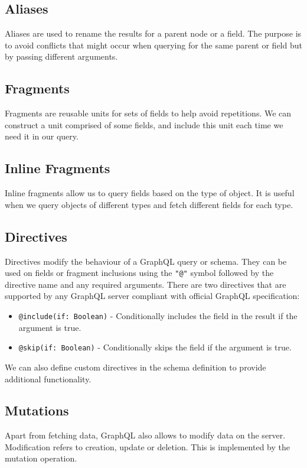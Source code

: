 \subsection{Aliases}
Aliases are used to rename the results for a parent node or a field. The purpose is to avoid conflicts that might occur when querying for the same parent or field but by passing different arguments.

\subsection{Fragments}
Fragments are reusable units for sets of fields to help avoid repetitions. We can construct a unit comprised of some fields, and include this unit each time we need it in our query.

\subsection{Inline Fragments}
Inline fragments allow us to query fields based on the type of object. It is useful when we query objects of different types and fetch different fields for each type.

\subsection{Directives}
Directives modify the behaviour of a GraphQL query or schema. They can be used on fields or fragment inclusions using the \texttt{"@"} symbol followed by the directive name and any required arguments. There are two directives that are supported by any GraphQL server compliant with official GraphQL specification:

\begin{itemize}
\item \texttt{@include(if: Boolean)} -  Conditionally includes the field in the result if the argument is true.
\item \texttt{@skip(if: Boolean)} -  Conditionally skips the field if the argument is true.
\end{itemize}

We can also define custom directives in the schema definition to provide additional functionality.

\subsection{Mutations}
Apart from fetching data, GraphQL also allows to modify data on the server. Modification refers to creation, update or deletion. This is implemented by the mutation operation. 

